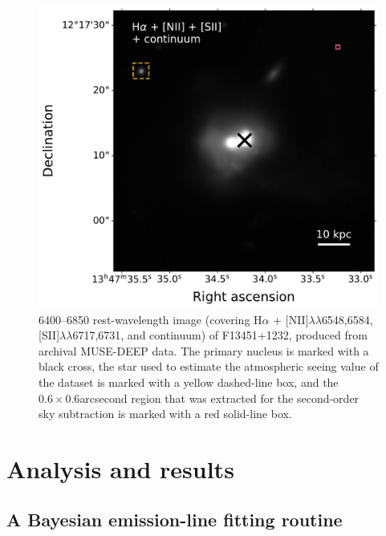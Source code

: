 \begin{figure}
    \centering
    \includegraphics[width=\linewidth]{figures/muse_f13451_1232/f13451_1232_halpha_sii.pdf}
    \caption[H$\alpha$ + {[}NII{]}$\lambda\lambda$6548,6584 + {[}SII{]}$\lambda\lambda$6717,6731 + continuum image of F13451+1232.]{6400--6850\;{\AA} rest-wavelength image (covering H$\alpha$ + [NII]$\lambda\lambda$6548,6584, [SII]$\lambda\lambda$6717,6731, and continuum) of F13451+1232, produced from archival MUSE-DEEP data. The primary nucleus is marked with a black cross, the star used to estimate the atmospheric seeing value of the dataset is marked with a yellow dashed-line box, and the $0.6\times0.6$\;arcsecond region that was extracted for the second-order sky subtraction is marked with a red solid-line box.}
    \label{fig: muse_f13451_1232: observations_and_data_reduction: halpha_sii_image}
\end{figure}

\section{Analysis and results}
\label{section: muse_f13451_1232: analysis_and_results}

\subsection{A Bayesian emission-line fitting routine}
\label{section: muse_f13451_1232: analysis_and_results: bayesian_emission_line_fitting_routine}

